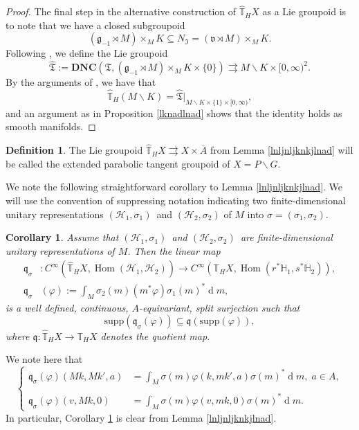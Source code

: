 \documentclass[a4paper,reqno]{amsart}
\numberwithin{equation}{section}
\def\Hom{\operatorname{Hom}}
\def\rd{\operatorname{d}\!}
\def\T{\mathbb{T}}
\newtheorem{cor}[thm]{Corollary}
\theoremstyle{definition}
\newtheorem{definition}[thm]{Definition}
\theoremstyle{remark}
\begin{document}
\begin{proof}
The final step in the alternative construction of $\widehat{\mathbb{T}}_HX$ as a Lie groupoid is to note that we have a closed subgroupoid 
$$(\mathfrak{g}_{-1}\rtimes M)\times _M K\subseteq N_\mathfrak{I}=(\mathfrak{v}\rtimes M)\times _M K.$$
Following \cite[Section 2 and 3]{mohsendef}, we define the Lie groupoid 
$$\hat{\mathfrak{T}}:=\pmb{DNC}(\mathfrak{T},(\mathfrak{g}_{-1}\rtimes M)\times _M K\times \{0\})\rightrightarrows M\backslash K\times [0,\infty)^2.$$
By the arguments of \cite[Section 2]{mohsendef}, we have that 
$$\hat{\T}_H(M\backslash K)=\hat{\mathfrak{T}}|_{M\backslash K\times \{1\}\times  [0,\infty)},$$
and an argument as in Proposition \ref{lknadlnad} shows that the identity holds as smooth manifolds.
\end{proof}

\begin{definition}
The Lie groupoid $\widehat{\mathbb{T}}_HX\rightrightarrows X \times \overline{A}$ from Lemma \ref{lnljnljknkjlnad} will be called the extended parabolic tangent groupoid of $X=P\backslash G$.
\end{definition}




We note the following straightforward corollary to Lemma \ref{lnljnljknkjlnad}. We will use the convention of suppressing notation indicating two finite-dimensional unitary representations  $(\mathcal{H}_1,\sigma_1)$ and $(\mathcal{H}_2,\sigma_2)$ of $M$ into $\sigma=(\sigma_1,\sigma_2)$. 

\begin{cor}
\label{kjnkjnkjnad}
Assume that $(\mathcal{H}_1,\sigma_1)$ and $(\mathcal{H}_2,\sigma_2)$ are finite-dimensional unitary representations of $M$. Then the linear map 
\begin{align*}
\mathfrak{q}_\sigma&:C^\infty(\widehat{\mathbb{T}}_HX,\Hom(\mathcal{H}_1,\mathcal{H}_2))\to C^\infty(\mathbb{T}_HX,\Hom(r^*\mathbb{H}_1,s^*\mathbb{H}_2)),\\
\mathfrak{q}_\sigma&(\varphi):=\int_M \sigma_2(m)(m^*\varphi)\sigma_1(m)^*\rd m,
\end{align*}
is a well defined, continuous, $A$-equivariant, split surjection such that 
$$\mathrm{supp}(\mathfrak{q}_\sigma(\varphi))\subseteq \mathfrak{q}(\mathrm{supp}(\varphi)),$$
where $\mathfrak{q}:\widehat{\mathbb{T}}_HX\to \mathbb{T}_HX$ denotes the quotient map.
\end{cor}

We note here that 
$$\begin{cases}
\mathfrak{q}_\sigma(\varphi)(Mk,Mk',a)&=\int_M \sigma(m)\varphi(k,mk',a)\sigma(m)^*\rd m, \; a\in A,\\
{}\\
\mathfrak{q}_\sigma(\varphi)(v,Mk,0)&=\int_M \sigma(m)\varphi(v,mk,0)\sigma(m)^*\rd m.
\end{cases}$$
In particular, Corollary \ref{kjnkjnkjnad} is clear from Lemma \ref{lnljnljknkjlnad}.
\end{document}
